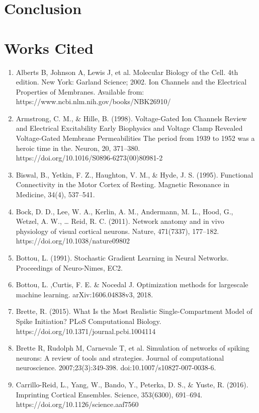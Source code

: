 \documentclass[11pt]{article}
\begin{document}
\section{Conclusion}

\section{Works Cited}


\begin{enumerate}
\item Alberts B, Johnson A, Lewis J, et al. Molecular Biology of the Cell. 4th edition. New York: Garland Science; 2002. Ion Channels and the Electrical Properties of Membranes. Available from: https://www.ncbi.nlm.nih.gov/books/NBK26910/
\item Armstrong, C. M., \& Hille, B. (1998). Voltage-Gated Ion Channels Review and Electrical Excitability Early Biophysics and Voltage Clamp Revealed Voltage-Gated Membrane Permeabilities The period from 1939 to 1952 was a heroic time in the. Neuron, 20, 371–380.\\ https://doi.org/10.1016/S0896-6273(00)80981-2
\item Biswal, B., Yetkin, F. Z., Haughton, V. M., \& Hyde, J. S. (1995). Functional Connectivity in the Motor Cortex of Resting. Magnetic Resonance in Medicine, 34(4), 537–541.
\item Bock, D. D., Lee, W. A., Kerlin, A. M., Andermann, M. L., Hood, G., Wetzel, A. W., … Reid, R. C. (2011). Network anatomy and in vivo physiology of visual cortical neurons. Nature, 471(7337), 177–182. https://doi.org/10.1038/nature09802
\item Bottou, L. (1991). Stochastic Gradient Learning in Neural Networks. Proceedings of Neuro-Nimes, EC2.
\item Bottou, L. ,Curtis, F. E. \& Nocedal J. Optimization methods for largescale
machine learning. arXiv:1606.04838v3, 2018.
\item Brette, R. (2015). What Is the Most Realistic Single-Compartment Model of Spike Initiation? PLoS Computational Biology. https://doi.org/10.1371/journal.pcbi.1004114
\item Brette R, Rudolph M, Carnevale T, et al. Simulation of networks of spiking neurons: A review of tools and strategies. Journal of computational neuroscience. 2007;23(3):349-398. doi:10.1007/s10827-007-0038-6.
\item Carrillo-Reid, L., Yang, W., Bando, Y., Peterka, D. S., \& Yuste, R. (2016). Imprinting Cortical Ensembles. Science, 353(6300), 691–694. https://doi.org/10.1126/science.aaf7560

\end{enumerate}
\end{document}
